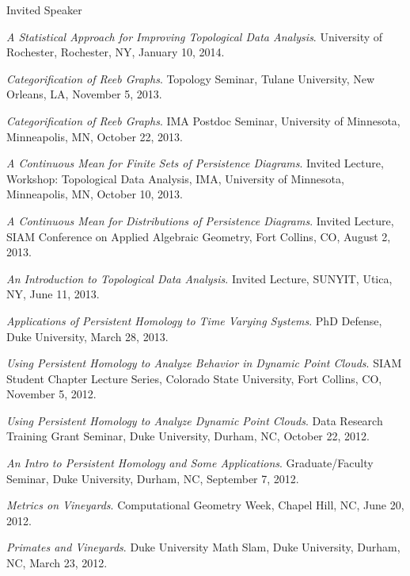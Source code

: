 \documentclass{resume} %
\begin{document}
\begin{rSection}{Invited Speaker}
\begin{etaremune}
\item\emph{A Statistical Approach for Improving Topological Data Analysis}. University of Rochester, Rochester, NY, January 10, 2014. 

\item\emph{Categorification of Reeb Graphs}. Topology Seminar, Tulane University, New Orleans, LA, November 5, 2013. 

\item\emph{Categorification of Reeb Graphs}. IMA Postdoc Seminar, University of Minnesota, Minneapolis, MN, October 22, 2013. 

\item\emph{A Continuous Mean for Finite Sets of Persistence Diagrams}. Invited Lecture, Workshop: Topological Data Analysis, IMA, University of Minnesota, Minneapolis, MN, October 10, 2013. 

\item\emph{A Continuous Mean for Distributions of Persistence Diagrams}. Invited Lecture, SIAM Conference on Applied Algebraic Geometry, Fort Collins, CO, August 2, 2013. 

\item\emph{An Introduction to Topological Data Analysis}. Invited Lecture, SUNYIT, Utica, NY, June 11, 2013. 

\item\emph{Applications of Persistent Homology to Time Varying Systems}. PhD Defense, Duke University, March 28, 2013. 

\item\emph{Using Persistent Homology to Analyze Behavior in Dynamic Point Clouds}. SIAM Student Chapter Lecture Series, Colorado State University, Fort Collins, CO, November 5, 2012. 

\item\emph{Using Persistent Homology to Analyze Dynamic Point Clouds}. Data Research Training Grant Seminar, Duke University, Durham, NC, October 22, 2012. 

\item\emph{An Intro to Persistent Homology and Some Applications}. Graduate/Faculty Seminar, Duke University, Durham, NC, September 7, 2012. 

\item\emph{Metrics on Vineyards}. Computational Geometry Week, Chapel Hill, NC, June 20, 2012. 

\item\emph{Primates and Vineyards}. Duke University Math Slam, Duke University, Durham, NC, March 23, 2012. 


\end{etaremune}
\end{rSection}
\end{document}
